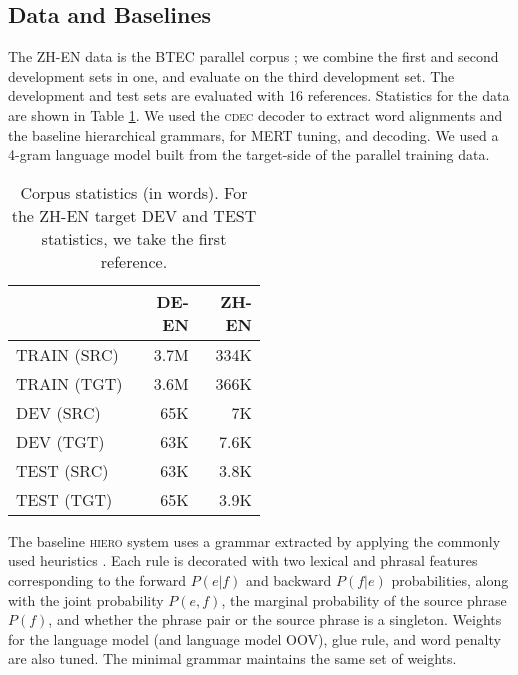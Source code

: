 \documentclass[11pt]{article}
\begin{document}
\subsection{Data and Baselines}
\label{sec:data}
The \textsc{ZH-EN} data is the BTEC parallel corpus \cite{Paul2009}; we combine the first and second development sets in one, and evaluate on the third development set.   
The development and test sets are evaluated with 16 references.  
Statistics for the data are shown in Table \ref{tab:corpusstats}.  
We used the \textsc{cdec} decoder \cite{Dyer2010} to extract word alignments and the baseline hierarchical grammars, for MERT tuning, and decoding.  
We used a 4-gram language model built from the target-side of the parallel training data.  
\begin{table}[h!]
  \begin{center}
    \begin{tabular}{p{0.5\linewidth}rr}
      \hline
      & \textsc{DE-EN} & \textsc{ZH-EN} \\
	  \hline
      TRAIN (SRC) & 3.7M & 334K \\
	  TRAIN (TGT) & 3.6M &  366K \\
	  DEV (SRC) & 65K & 7K \\
      DEV (TGT) & 63K &  7.6K\\
	  TEST (SRC) & 63K &  3.8K \\
	  TEST (TGT) & 65K & 3.9K \\
	\end{tabular}
  \end{center}
  \caption{Corpus statistics (in words).  For the \textsc{ZH-EN} target DEV and TEST statistics, we take the first reference.}
  \label{tab:corpusstats}
\end{table}

The baseline \textsc{hiero} system uses a grammar extracted by applying the commonly used heuristics \cite{Chiang2007}.  
Each rule is decorated with two lexical and phrasal features corresponding to the forward $P(e|f)$ and backward $P(f|e)$ probabilities, along with the joint probability $P(e,f)$, the marginal probability of the source phrase $P(f)$, and whether the phrase pair or the source phrase is a singleton. 
Weights for the language model (and language model OOV), glue rule, and word penalty are also tuned. 
The minimal grammar maintains the same set of weights. 
\end{document}
